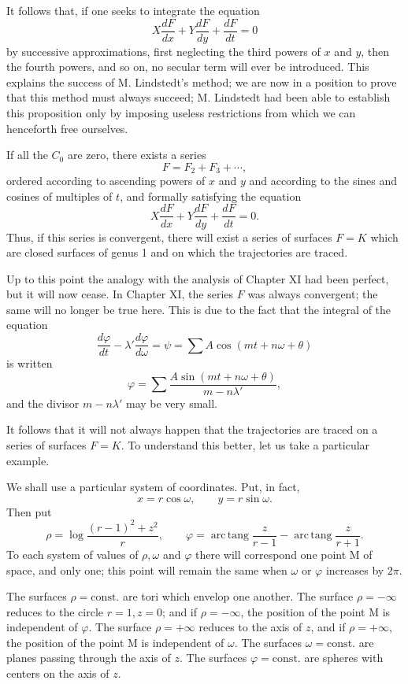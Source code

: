 \documentclass[11pt]{article}
\begin{document}
It follows that, if one seeks to integrate the equation
\[
X\frac{dF}{dx}+Y\frac{dF}{dy}+\frac{dF}{dt}=0
\]
by successive approximations, first neglecting the third powers of $x$ and $y$, then the fourth powers, and so on, no secular term will ever be introduced. This explains the success of M. Lindstedt’s method; we are now in a position to prove that this method must always succeed; M. Lindstedt had been able to establish this proposition only by imposing useless restrictions from which we can henceforth free ourselves.

If all the $C_0$ are zero, there exists a series
\[
F=F_2+F_3+\cdots,
\]
ordered according to ascending powers of $x$ and $y$ and according to the sines and cosines of multiples of $t$, and formally satisfying the equation
\[
X\frac{dF}{dx}+Y\frac{dF}{dy}+\frac{dF}{dt}=0.
\]
Thus, if this series is convergent, there will exist a series of surfaces $F=K$ which are closed surfaces of genus 1 and on which the trajectories are traced.

Up to this point the analogy with the analysis of Chapter XI had been perfect, but it will now cease. In Chapter XI, the series $F$ was always convergent; the same will no longer be true here. This is due to the fact that the integral of the equation
\begin{equation}
\frac{d\varphi}{dt}-\lambda'\frac{d\varphi}{d\omega}=\psi=\sum A\cos(mt+n\omega+\theta)
\tag{6 bis}
\end{equation}
is written
\[
\varphi=\sum \frac{A\sin(mt+n\omega+\theta)}{m-n\lambda'},
\]
and the divisor $m-n\lambda'$ may be very small.

It follows that it will not always happen that the trajectories are traced on a series of surfaces $F=K$. To understand this better, let us take a particular example.

We shall use a particular system of coordinates. Put, in fact,
\[
x=r\cos\omega,
\qquad
y=r\sin\omega.
\]
Then put
\[
\rho=\log\frac{(r-1)^2+z^2}{r},
\qquad
\varphi=\operatorname{arc\,tang}\frac{z}{r-1}
-\operatorname{arc\,tang}\frac{z}{r+1}.
\]
To each system of values of $\rho,\omega$ and $\varphi$ there will correspond one point M of space, and only one; this point will remain the same when $\omega$ or $\varphi$ increases by $2\pi$.

The surfaces $\rho=\mathrm{const.}$ are tori which envelop one another. The surface $\rho=-\infty$ reduces to the circle $r=1,z=0$; and if $\rho=-\infty$, the position of the point M is independent of $\varphi$. The surface $\rho=+\infty$ reduces to the axis of $z$, and if $\rho=+\infty$, the position of the point M is independent of $\omega$. The surfaces $\omega=\mathrm{const.}$ are planes passing through the axis of $z$. The surfaces $\varphi=\mathrm{const.}$ are spheres with centers on the axis of $z$.
\end{document}
